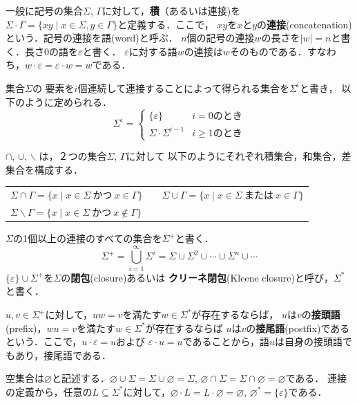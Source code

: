 \documentclass[a4j,dvipdfmx]{jbook}
\begin{document}
一般に記号の集合$\Sigma$, $\Gamma$に対して，{\bf 積}（あるいは連接)を
$\Sigma\cdot\Gamma=\{xy\;|\;x\in\Sigma,y\in\Gamma\}$と定義する．ここで，
$xy$を$x$と$y$の{\bf 連接}(concatenation)という．記号の連接を語(word)と呼ぶ．
$n$個の記号の連接$w$の長さを$|w|=n$と書く．長さ0の語を$\varepsilon$と書く．
$\varepsilon$に対する語$w$の連接は$w$そのものである．すなわち，$w\cdot\varepsilon
  =\varepsilon\cdot w=w$である．

集合$\Sigma$の
要素を$i$個連続して連接することによって得られる集合を$\Sigma^i$と書き，
以下のように定められる．
\[\Sigma^i=\begin{cases}\{\varepsilon\}         & \mbox{$i=0$のとき}     \\
             \Sigma\cdot\Sigma^{i-1} & \mbox{$i\geq 1$のとき}\end{cases}\]

$\cap$, $\cup$, $\backslash$ は，２つの集合$\Sigma$, $\Gamma$に対して
以下のようにそれぞれ積集合，和集合，差集合を構成する．

\begin{center}
  \begin{tabular}{lcl}
    $\Sigma\cap\Gamma=\{x\;|\;x\in\Sigma\ \mbox{かつ}\ x\in\Gamma\}$
     &  &
    $\Sigma\cup\Gamma=\{x\;|\;x\in\Sigma\ \mbox{または}\ x\in\Gamma\}$ \\
    $\Sigma\backslash\Gamma=\{x\;|\;x\in\Sigma\ \mbox{かつ}\ x\notin\Gamma\}$
  \end{tabular}
\end{center}

$\Sigma$の1個以上の連接のすべての集合を$\Sigma^+$と書く．
\[\Sigma^+=\bigcup_{i=1}^\infty\Sigma^i=\Sigma\cup\Sigma^2\cup\cdots\cup\Sigma^n\cup\cdots\]
$\{\varepsilon\}\cup\Sigma^+$を$\Sigma$の{\bf 閉包}(closure)あるいは
{\bf クリーネ閉包}(Kleene closure)と呼び，$\Sigma^\ast$と書く．

$u,v\in\Sigma^+$に対して，$uw=v$を満たす$w\in\Sigma^\ast$が存在するならば，
$u$は$v$の{\bf 接頭語}(prefix)，$wu=v$を満たす$w\in\Sigma^\ast$が存在するならば
$u$は$v$の{\bf 接尾語}(postfix)であるという．ここで，$u\cdot\varepsilon=u$および
$\varepsilon\cdot u=u$であることから，語$u$は自身の接頭語でもあり，接尾語である．

空集合は$\varnothing$と記述する．$\varnothing\cup\Sigma=\Sigma\cup\varnothing=\Sigma$,
$\varnothing\cap\Sigma=\Sigma\cap\varnothing=\varnothing$である．
連接の定義から，任意の$L\subseteq\Sigma^\ast$に対して，$\varnothing\cdot L=
  L\cdot\varnothing=\varnothing$, $\varnothing^\ast=\{\varepsilon\}$である．
\end{document}

